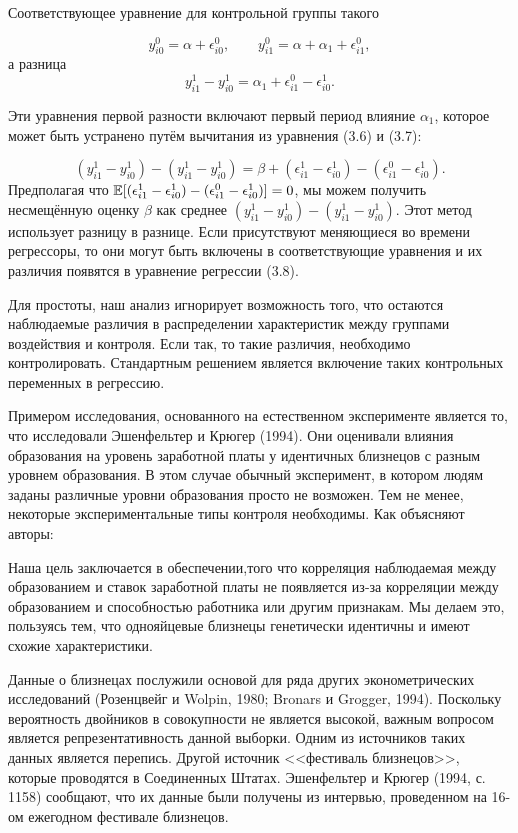Соответствующее уравнение для контрольной группы такого

\[
y^{0}_{i0}=\alpha+\epsilon^{0}_{i0}, \qquad
y^{0}_{i1}=\alpha+\alpha_{1}+\epsilon^{0}_{i1},
\]
а разница
\begin{equation}
y^{1}_{i1}-y^{1}_{i0}=\alpha_{1}+\epsilon^{0}_{i1}-\epsilon^{1}_{i0}.
\end{equation}

Эти уравнения первой разности включают первый период влияние $\alpha_{1}$, которое может быть устранено путём вычитания из уравнения (3.6) и (3.7):

\begin{equation}
(y^{1}_{i1}-y^{1}_{i0})-(y^{1}_{i1}-y^{1}_{i0})=\beta+(\epsilon^{1}_{i1}-\epsilon^{1}_{i0})-(\epsilon^{0}_{i1}-\epsilon^{1}_{i0}).
\end{equation}
Предполагая что $\mathbb{E}[(\epsilon^{1}_{i1}-\epsilon^{1}_{i0})-(\epsilon^{0}_{i1}-\epsilon^{1}_{i0})]=0$, мы можем получить несмещённую оценку $\beta$ как среднее $(y^{1}_{i1}-y^{1}_{i0})-(y^{1}_{i1}-y^{1}_{i0})$. Этот метод использует разницу в разнице. Если присутствуют меняющиеся во времени регрессоры, то они могут быть включены в соответствующие уравнения и их различия появятся в уравнение регрессии (3.8).


Для простоты, наш анализ игнорирует возможность того, что остаются наблюдаемые различия в распределении характеристик между группами воздействия и контроля. Если так, то такие различия, необходимо контролировать. Стандартным решением является включение таких контрольных переменных в регрессию.


Примером исследования, основанного на естественном эксперименте является то, что исследовали Эшенфельтер и Крюгер (1994). Они оценивали влияния образования на уровень заработной платы у идентичных близнецов с разным уровнем образования. В этом случае обычный эксперимент, в котором людям заданы различные уровни образования просто не возможен. Тем не менее, некоторые экспериментальные типы контроля необходимы. Как объясняют авторы:


Наша цель заключается в обеспечении,того что корреляция наблюдаемая между образованием и ставок заработной платы не появляется из-за корреляции между образованием и способностью работника или другим признакам. Мы делаем это, пользуясь тем, что однояйцевые близнецы генетически идентичны и имеют схожие характеристики.


Данные о близнецах послужили основой для ряда других эконометрических исследований (Розенцвейг и Wolpin, 1980; Bronars и Grogger, 1994). Поскольку вероятность двойников в совокупности не является высокой, важным вопросом  является репрезентативность данной выборки. Одним из источников таких данных является перепись. Другой источник <<фестиваль близнецов>>, которые проводятся в Соединенных Штатах. Эшенфельтер и Крюгер (1994, с. 1158) сообщают, что их данные были получены из интервью, проведенном на 16-ом ежегодном фестивале близнецов.


